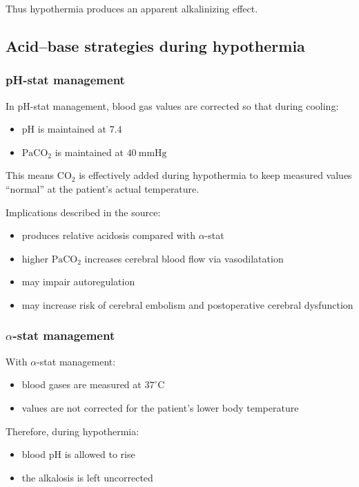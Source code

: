 \documentclass[11pt,a4paper]{article}
\begin{document}
Thus hypothermia produces an apparent alkalinizing effect.

\subsection{Acid--base strategies during hypothermia}

\subsubsection{pH-stat management}
In pH-stat management, blood gas values are corrected so that during cooling:
\begin{itemize}
  \item pH is maintained at \(7.4\)
  \item \(\mathrm{PaCO_2}\) is maintained at \(40~\mathrm{mmHg}\)
\end{itemize}

This means \(\mathrm{CO_2}\) is effectively added during hypothermia to keep measured values ``normal'' at the patient's actual temperature.

Implications described in the source:
\begin{itemize}
  \item produces relative acidosis compared with \(\alpha\)-stat
  \item higher \(\mathrm{PaCO_2}\) increases cerebral blood flow via vasodilatation
  \item may impair autoregulation
  \item may increase risk of cerebral embolism and postoperative cerebral dysfunction
\end{itemize}

\subsubsection{\(\alpha\)-stat management}
With \(\alpha\)-stat management:
\begin{itemize}
  \item blood gases are measured at \(37^\circ\mathrm{C}\)
  \item values are not corrected for the patient's lower body temperature
\end{itemize}

Therefore, during hypothermia:
\begin{itemize}
  \item blood pH is allowed to rise
  \item the alkalosis is left uncorrected
\end{itemize}
\end{document}
